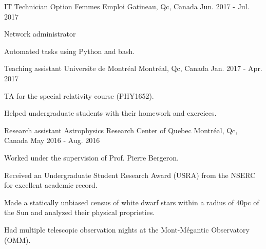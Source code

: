 \begin{cventries}
  \cventry
    {IT Technician}
    {Option Femmes Emploi}
    {Gatineau, Qc, Canada}
    {Jun. 2017 - Jul. 2017}
    {
      \begin{cvitems}
        \item {Network administrator}
        \item {Automated tasks using Python and bash.}
      \end{cvitems}
    }
  \cventry
    {Teaching assistant}
    {Universite de Montr\'eal}
    {Montr\'eal, Qc, Canada}
    {Jan. 2017 - Apr. 2017}
    {
      \begin{cvitems}
        \item {TA for the special relativity course (PHY1652).}
        \item {Helped undergraduate students with their homework and exercices.}
      \end{cvitems}
    }
  \cventry
    {Research assistant}
    {Astrophysics Research Center of Quebec}
    {Montr\'eal, Qc, Canada}
    {May 2016 - Aug. 2016}
    {
      \begin{cvitems}
        \item {Worked under the supervision of Prof. Pierre Bergeron.}
        \item {Received an Undergraduate Student Research Award (USRA) from the NSERC for excellent academic record.}
        \item {Made a statically unbiased census of white dwarf stars within a radius of 40pc of the Sun and analyzed their physical proprieties.}
        \item {Had multiple telescopic observation nights at the Mont-M\'egantic Observatory (OMM).}
      \end{cvitems}
    }

\end{cventries}
